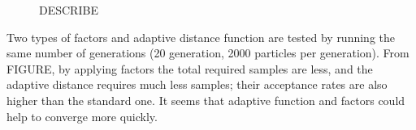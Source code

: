 \begin{figure}[ht]
    \begin{center}
    \end{center}

    \caption[Factors and adaptive distance experiments]%
    {Factors and adaptive distance experiments. Left: Total required samples. Right: acceptance rates in each generation}
    \label{fig:factor}

    \begin{center}
    \end{center}

    \caption[CAPTION]%
    {DESCRIBE}
    \label{fig:factor_sim}

\end{figure}

Two types of factors and adaptive distance function are tested by running the same number of generations (20 generation, 2000 particles per generation). From FIGURE, by applying factors the total required samples are less, and the adaptive distance requires much less samples; their acceptance rates are also higher than the standard one. It seems that adaptive function and factors could help to converge more quickly.


